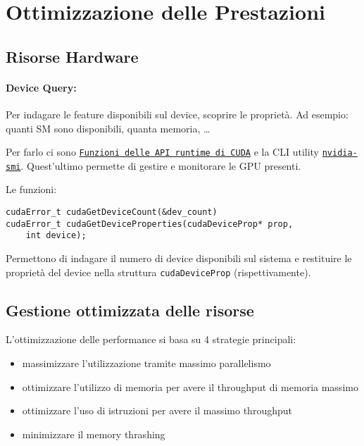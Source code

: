 \section{Ottimizzazione delle Prestazioni}

\subsection{Risorse Hardware}

\paragraph{Device Query:} Per indagare le feature disponibili sul device, scoprire le proprietà. Ad esempio: quanti SM sono disponibili, quanta memoria, \dots

Per farlo ci sono \href{http://docs.nvidia.com/cuda/cuda-runtime-api}{\texttt{Funzioni delle API runtime di CUDA}} e la CLI utility \href{https://developer.nvidia.com/nvidia-system-management-interface}{\texttt{nvidia-smi}}. Quest'ultimo permette di gestire e monitorare le GPU presenti.

Le funzioni: 
\begin{verbatim}
cudaError_t cudaGetDeviceCount(&dev_count)
cudaError_t cudaGetDeviceProperties(cudaDeviceProp* prop,
    int device);
\end{verbatim}
Permettono di indagare il numero di device disponibili sul sistema e restituire le proprietà del device nella struttura \texttt{cudaDeviceProp} (rispettivamente).

\subsection{Gestione ottimizzata delle risorse}

L'ottimizzazione delle performance si basa su 4 strategie principali:
\begin{itemize}
	\item massimizzare l'utilizzazione tramite massimo parallelismo
	
	\item ottimizzare l'utilizzo di memoria per avere il throughput di memoria massimo
	
	\item ottimizzare l'uso di istruzioni per avere il massimo throughput
	
	\item minimizzare il memory thrashing
\end{itemize}

